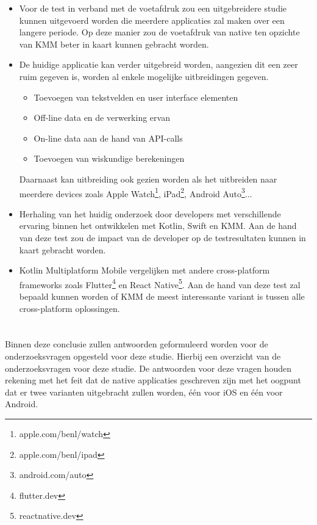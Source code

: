 \begin{itemize}
    \item Voor de test in verband met de voetafdruk zou een uitgebreidere studie kunnen uitgevoerd worden die meerdere applicaties  zal maken over een langere periode. Op deze manier zou de voetafdruk van native ten opzichte van KMM beter in kaart kunnen gebracht worden.
    
    \item De huidige applicatie kan verder uitgebreid worden, aangezien dit een zeer ruim gegeven is, worden al enkele mogelijke uitbreidingen gegeven.
    \begin{itemize}
        \item Toevoegen van tekstvelden en user interface elementen
        \item Off-line data en de verwerking ervan
        \item On-line data aan de hand van API-calls
        \item Toevoegen van wiskundige berekeningen
    \end{itemize}
    
    Daarnaast kan uitbreiding ook gezien worden als het uitbreiden naar meerdere devices zoals Apple Watch\footnote{apple.com/benl/watch}, iPad\footnote{apple.com/benl/ipad}, Android Auto\footnote{android.com/auto}... 
    
    \item Herhaling van het huidig onderzoek door developers met verschillende ervaring binnen het ontwikkelen met Kotlin, Swift en KMM. Aan de hand van deze test zou de impact van de developer op de testresultaten kunnen in kaart gebracht worden.
    
    \item Kotlin Multiplatform Mobile vergelijken met andere cross-platform frameworks zoals Flutter\footnote{flutter.dev} en React Native\footnote{reactnative.dev}. Aan de hand van deze test zal bepaald kunnen worden of KMM de meest interessante variant is tussen alle cross-platform oplossingen.
\end{itemize}


\section{}
\label{sec:C-algemene-conclusie}    
Binnen deze conclusie zullen antwoorden geformuleerd worden voor de onderzoeksvragen opgesteld voor deze studie. Hierbij een overzicht van de onderzoeksvragen voor deze studie. De antwoorden voor deze vragen houden rekening met het feit dat de native applicaties geschreven zijn met het oogpunt dat er twee varianten uitgebracht zullen worden, één voor iOS en één voor Android.

